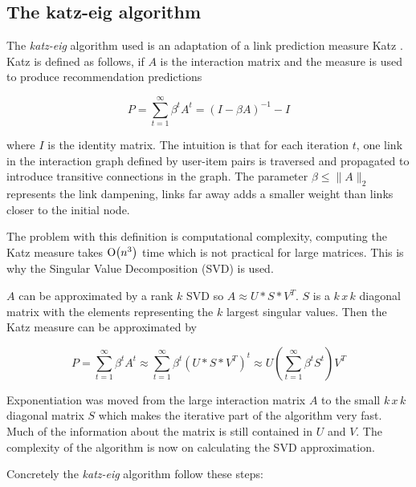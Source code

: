 \newpage
\subsection{The katz-eig algorithm}\label{sec:background:theory:katzeig}

The \textit{katz-eig} algorithm used is an adaptation \citep{shin2012multi} of a link prediction measure Katz \citep{katz1953new}. Katz is defined as follows, if $A$ is the interaction matrix and the measure is used to produce recommendation predictions

\begin{equation}
    P = \sum_{t=1}^{\infty} \beta^t A^t = (I - \beta A)^{-1} - I
\end{equation}

where $I$ is the identity matrix. The intuition is that for each iteration $t$, one link in the interaction graph defined by user-item pairs is traversed and propagated to introduce transitive connections in the graph. The parameter $\beta \leq \| A \|_2$ represents the link dampening, links far away adds a smaller weight than links closer to the initial node.

The problem with this definition is computational complexity, computing the Katz measure takes $\operatorname{O}\bigl(n^3\bigr)$ time which is not practical for large matrices. This is why the Singular Value Decomposition (SVD) is used.

$A$ can be approximated by a rank $k$ SVD so $A \approx U * S * V^T$. $S$ is a $k\,x\,k$ diagonal matrix with the elements representing the $k$ largest singular values. Then the Katz measure can be approximated by

\begin{equation}
    P = \sum_{t=1}^{\infty} \beta^t A^t
    \approx \sum_{t=1}^{\infty} \beta^t (U * S * V^T)^t
    \approx U \left( \sum_{t=1}^{\infty} \beta^t S^t \right) V^T
\end{equation}

Exponentiation was moved from the large interaction matrix $A$ to the small $k\,x\,k$ diagonal matrix $S$ which makes the iterative part of the algorithm very fast. Much of the information about the matrix is still contained in $U$ and $V$. The complexity of the algorithm is now on calculating the SVD approximation.


Concretely the \textit{katz-eig} algorithm follow these steps:


